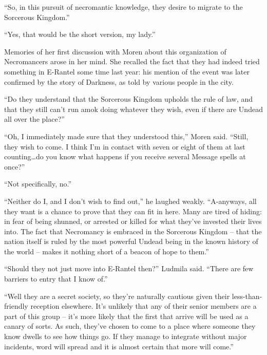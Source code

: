  

“So, in this pursuit of necromantic knowledge, they desire to migrate to the Sorcerous Kingdom.”

 

“Yes, that would be the short version, my lady.”

 

Memories of her first discussion with Moren about this organization of Necromancers arose in her mind. She recalled the fact that they had indeed tried something in E-Rantel some time last year: his mention of the event was later confirmed by the story of Darkness, as told by various people in the city.

 

“Do they understand that the Sorcerous Kingdom upholds the rule of law, and that they still can’t run amok doing whatever they wish, even if there are Undead all over the place?”

 

“Oh, I immediately made sure that they understood this,” Moren said. “Still, they wish to come. I think I’m in contact with seven or eight of them at last counting…do you know what happens if you receive several Message spells at once?”

 

“Not specifically, no.”

 

“Neither do I, and I don’t wish to find out,” he laughed weakly. “A-anyways, all they want is a chance to prove that they can fit in here. Many are tired of hiding: in fear of being shunned, or arrested or killed for what they’ve invested their lives into. The fact that Necromancy is embraced in the Sorcerous Kingdom – that the nation itself is ruled by the most powerful Undead being in the known history of the world – makes it nothing short of a beacon of hope to them.”

 

“Should they not just move into E-Rantel then?” Ludmila said. “There are few barriers to entry that I know of.”

 

“Well they are a secret society, so they’re naturally cautious given their less-than-friendly reception elsewhere. It’s unlikely that any of their senior members are a part of this group – it’s more likely that the first that arrive will be used as a canary of sorts. As such, they’ve chosen to come to a place where someone they know dwells to see how things go. If they manage to integrate without major incidents, word will spread and it is almost certain that more will come.”

